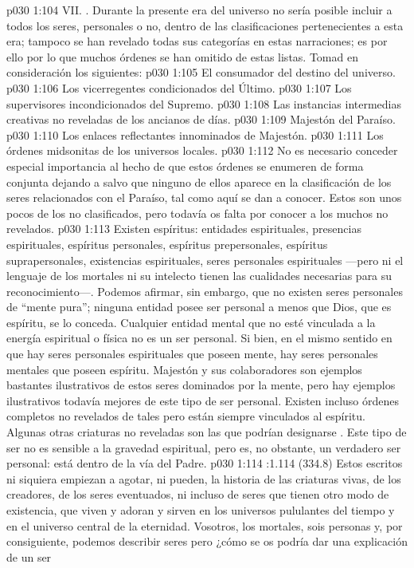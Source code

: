 \vs p030 1:104 \pc VII. . Durante la presente era del universo no sería posible incluir a todos los seres, personales o no, dentro de las clasificaciones pertenecientes a esta era; tampoco se han revelado todas sus categorías en estas narraciones; es por ello por lo que muchos órdenes se han omitido de estas listas. Tomad en consideración los siguientes:
\vs p030 1:105 El consumador del destino del universo.
\vs p030 1:106 Los vicerregentes condicionados del Último.
\vs p030 1:107 Los supervisores incondicionados del Supremo.
\vs p030 1:108 Las instancias intermedias creativas no reveladas de los ancianos de días.
\vs p030 1:109 Majestón del Paraíso.
\vs p030 1:110 Los enlaces reflectantes innominados de Majestón.
\vs p030 1:111 Los órdenes midsonitas de los universos locales.
\vs p030 1:112 \pc No es necesario conceder especial importancia al hecho de que estos órdenes se enumeren de forma conjunta dejando a salvo que ninguno de ellos aparece en la clasificación de los seres relacionados con el Paraíso, tal como aquí se dan a conocer. Estos son unos pocos de los no clasificados, pero todavía os falta por conocer a los muchos no revelados.
\vs p030 1:113 Existen espíritus: entidades espirituales, presencias espirituales, espíritus personales, espíritus prepersonales, espíritus suprapersonales, existencias espirituales, seres personales espirituales ---pero ni el lenguaje de los mortales ni su intelecto tienen las cualidades necesarias para su reconocimiento---. Podemos afirmar, sin embargo, que no existen seres personales de “mente pura”; ninguna entidad posee ser personal a menos que Dios, que es espíritu, se lo conceda. Cualquier entidad mental que no esté vinculada a la energía espiritual o física no es un ser personal. Si bien, en el mismo sentido en que hay seres personales espirituales que poseen mente, hay seres personales mentales que poseen espíritu. Majestón y sus colaboradores son ejemplos bastantes ilustrativos de estos seres dominados por la mente, pero hay ejemplos ilustrativos todavía mejores de este tipo de ser personal. Existen incluso órdenes completos no revelados de tales  pero están siempre vinculados al espíritu. Algunas otras criaturas no reveladas son las que podrían designarse . Este tipo de ser no es sensible a la gravedad espiritual, pero es, no obstante, un verdadero ser personal: está dentro de la vía del Padre.
\vs p030 1:114 :1.114 (334.8) Estos escritos ni siquiera empiezan a agotar, ni pueden, la historia de las criaturas vivas, de los creadores, de los seres eventuados, ni incluso de seres que tienen otro modo de existencia, que viven y adoran y sirven en los universos pululantes del tiempo y en el universo central de la eternidad. Vosotros, los mortales, sois personas y, por consiguiente, podemos describir seres  pero ¿cómo se os podría dar una explicación de un ser 
